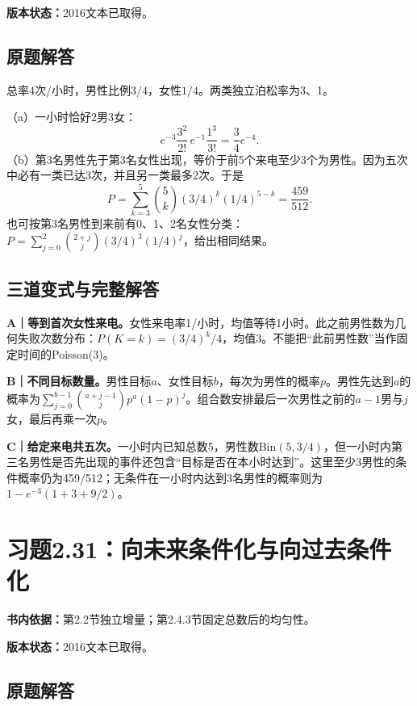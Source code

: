 \documentclass[
  11pt,
  a4paper,
  UTF8,fontset=fandol]{ctexart}
\let\OldSection\section
\renewcommand{\section}{\Needspace{7\baselineskip}\OldSection}
\let\OldSubsection\subsection
\renewcommand{\subsection}{\Needspace{5\baselineskip}\OldSubsection}
\begin{document}
\textbf{版本状态：}2016文本已取得。

\subsection{原题解答}\label{ux539fux9898ux89e3ux7b54-29}

总率4次/小时，男性比例\(3/4\)，女性\(1/4\)。两类独立泊松率为3、1。

（a）一小时恰好2男3女：
\[\boxed{e^{-3}\frac{3^2}{2!}\,e^{-1}\frac{1^3}{3!}=\frac34e^{-4}.}\]
（b）第3名男性先于第3名女性出现，等价于前5个来电至少3个为男性。因为五次中必有一类已达3次，并且另一类最多2次。于是
\[P=\sum_{k=3}^5\binom5k(3/4)^k(1/4)^{5-k}=\boxed{\frac{459}{512}}.\]
也可按第3名男性到来前有0、1、2名女性分类：\(P=\sum_{j=0}^2\binom{2+j}{j}(3/4)^3(1/4)^j\)，给出相同结果。

\subsection{三道变式与完整解答}\label{ux4e09ux9053ux53d8ux5f0fux4e0eux5b8cux6574ux89e3ux7b54-29}

\textbf{A｜等到首次女性来电。}女性来电率1/小时，均值等待1小时。此之前男性数为几何失败次数分布：\(P(K=k)=(3/4)^k/4\)，均值3。不能把``此前男性数''当作固定时间的Poisson(3)。

\textbf{B｜不同目标数量。}男性目标\(a\)、女性目标\(b\)，每次为男性的概率\(p\)。男性先达到\(a\)的概率为\(\sum_{j=0}^{b-1}\binom{a+j-1}{j}p^a(1-p)^j\)。组合数安排最后一次男性之前的\(a-1\)男与\(j\)女，最后再乘一次\(p\)。

\textbf{C｜给定来电共五次。}一小时内已知总数5，男性数Bin\((5,3/4)\)，但一小时内第三名男性是否先出现的事件还包含``目标是否在本小时达到''。这里至少3男性的条件概率仍为459/512；无条件在一小时内达到3名男性的概率则为\(1-e^{-3}(1+3+9/2)\)。

\newpage

\section{习题2.31：向未来条件化与向过去条件化}\label{ux4e60ux98982.31ux5411ux672aux6765ux6761ux4ef6ux5316ux4e0eux5411ux8fc7ux53bbux6761ux4ef6ux5316}

\textbf{书内依据：}第2.2节独立增量；第2.4.3节固定总数后的均匀性。

\textbf{版本状态：}2016文本已取得。

\subsection{原题解答}\label{ux539fux9898ux89e3ux7b54-30}
\end{document}
